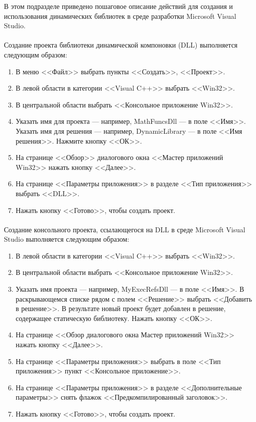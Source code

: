 В этом подразделе приведено пошаговое описание действий для создания и использования
динамических библиотек в среде разработки Microsoft Visual Studio.

\paragraph{}
Создание проекта библиотеки динамической компоновки (DLL) выполняется следующим образом:
\begin{enumerate}
\item
  В меню <<Файл>> выбрать пункты <<Создать>>, <<Проект>>.
\item
  В левой области в категории <<Visual C++>> выбрать <<Win32>>.
\item
  В центральной области выбрать <<Консольное приложение Win32>>.
\item
  Указать имя для проекта --- например, MathFuncsDll --- в поле <<Имя>>.
  Указать имя для решения --- например, DynamicLibrary --- в поле <<Имя решения>>.
  Нажмите кнопку <<ОК>>.
\item
  На странице <<Обзор>> диалогового окна <<Мастер приложений Win32>> нажать кнопку <<Далее>>.
\item
  На странице <<Параметры приложения>> в разделе <<Тип приложения>> выбрать <<DLL>>.
\item
  Нажать кнопку <<Готово>>, чтобы создать проект.
\end{enumerate}

\paragraph{}
Создание консольного проекта, ссылающегося на DLL в среде
Microsoft Visual Studio выполняется следующим образом:

\begin{enumerate}
\item
  В левой области в категории <<Visual C++>> выбрать <<Win32>>.
\item
  В центральной области выбрать <<Консольное приложение Win32>>.
\item
  Указать имя проекта --- например, MyExecRefsDll --- в поле <<Имя>>.
  В раскрывающемся списке рядом с полем <<Решение>> выбрать <<Добавить в решение>>.
  В результате новый проект будет добавлен в решение, содержащее статическую библиотеку.
  Нажать кнопку <<ОК>>.
\item
  На странице <<Обзор диалогового окна Мастер приложений Win32>> нажать кнопку <<Далее>>.
\item
  На странице <<Параметры приложения>> выбрать в поле <<Тип приложения>> пункт
  <<Консольное приложение>>.
\item
  На странице <<Параметры приложения>> в разделе <<Дополнительные параметры>>
  снять флажок <<Предкомпилированный заголовок>>.
\item
  Нажать кнопку <<Готово>>, чтобы создать проект.
\end{enumerate}

